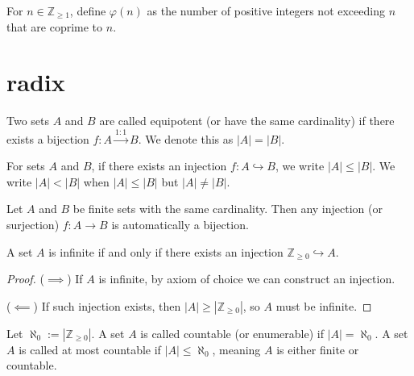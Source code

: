 \begin{definition}
  For $n \in \mathbb{Z}_{\geq 1}$, define $\varphi(n)$ as the number of positive integers not exceeding $n$ that are coprime to $n$.
\end{definition}

\section{radix}

\begin{definition}
  Two sets $A$ and $B$ are called equipotent (or have the same cardinality) if there exists a bijection $f : A \xrightarrow{1:1} B$. We denote this as $|A| = |B|$.
\end{definition}

\begin{definition}
  For sets $A$ and $B$, if there exists an injection $f : A \hookrightarrow  B$, we write $|A| \leq |B|$.
  We write $|A| < |B|$ when $|A| \leq |B|$ but $|A| \neq |B|$.
\end{definition}

\begin{proposition}
  Let $A$ and $B$ be finite sets with the same cardinality. Then any injection (or surjection) $f : A \to B$ is automatically a bijection.
\end{proposition}

\begin{proposition}
  A set $A$ is infinite if and only if there exists an injection $\mathbb{Z}_{\geq 0}  \hookrightarrow A$.
\end{proposition}

\begin{proof}
  ($\implies$) If $A$ is infinite, by axiom of choice we can construct an injection.

  ($\impliedby$) If such injection exists, then $|A| \geq |\mathbb{Z}_{\geq 0}|$, so $A$ must be infinite.
\end{proof}

\begin{definition}
  Let $\aleph_0 := |\mathbb{Z}_{\geq 0}|$. A set $A$ is called countable (or enumerable) if $|A| = \aleph_0$.
  A set $A$ is called at most countable if $|A| \leq \aleph_0$, meaning $A$ is either finite or countable.
\end{definition}

